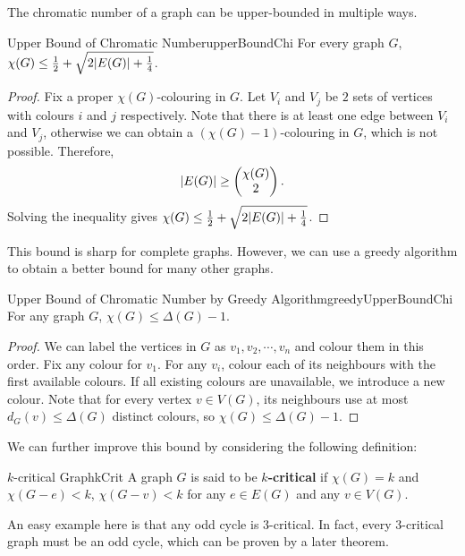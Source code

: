 \documentclass[math, code]{amznotes}
\theoremstyle{remark}
\begin{document}
The chromatic number of a graph can be upper-bounded in multiple ways.
\begin{probox}{Upper Bound of Chromatic Number}{upperBoundChi}
    For every graph $G$, $\chi(G) \leq \frac{1}{2} + \sqrt{2{\left\lvert {E(G)} \right\rvert} + \frac{1}{4}}$.
    \tcblower
    \begin{proof}
        Fix a proper $\chi(G)$-colouring in $G$. Let $V_i$ and $V_j$ be $2$ sets of vertices with colours $i$ and $j$ respectively. Note that there is at least one edge between $V_i$ and $V_j$, otherwise we can obtain a $(\chi(G) - 1)$-colouring in $G$, which is not possible. Therefore, 
        \begin{equation*}
            {\left\lvert {E(G)} \right\rvert} \geq \begin{pmatrix}
                \chi(G) \\
                2
            \end{pmatrix}.
        \end{equation*}
        Solving the inequality gives $\chi(G) \leq \frac{1}{2} + \sqrt{2{\left\lvert {E(G)} \right\rvert} + \frac{1}{4}}$.
    \end{proof}
\end{probox}
This bound is sharp for complete graphs. However, we can use a greedy algorithm to obtain a better bound for many other graphs.
\begin{probox}{Upper Bound of Chromatic Number by Greedy Algorithm}{greedyUpperBoundChi}
    For any graph $G$, $\chi(G) \leq \Delta(G) - 1$.
    \tcblower
    \begin{proof}
        We can label the vertices in $G$ as $v_1, v_2, \cdots, v_n$ and colour them in this order. Fix any colour for $v_1$. For any $v_i$, colour each of its neighbours with the first available colours. If all existing colours are unavailable, we introduce a new colour. Note that for every vertex $v \in V(G)$, its neighbours use at most $d_G(v) \leq \Delta(G)$ distinct colours, so $\chi(G) \leq \Delta(G) - 1$.
    \end{proof}
\end{probox}
We can further improve this bound by considering the following definition:
\begin{dfnbox}{$k$-critical Graph}{kCrit}
    A graph $G$ is said to be {\color{red} \textbf{$k$-critical}} if $\chi(G) = k$ and $\chi(G - e) < k$, $\chi(G - v) < k$ for any $e \in E(G)$ and any $v \in V(G)$.
\end{dfnbox}
An easy example here is that any odd cycle is $3$-critical. In fact, every $3$-critical graph must be an odd cycle, which can be proven by a later theorem.
\end{document}
